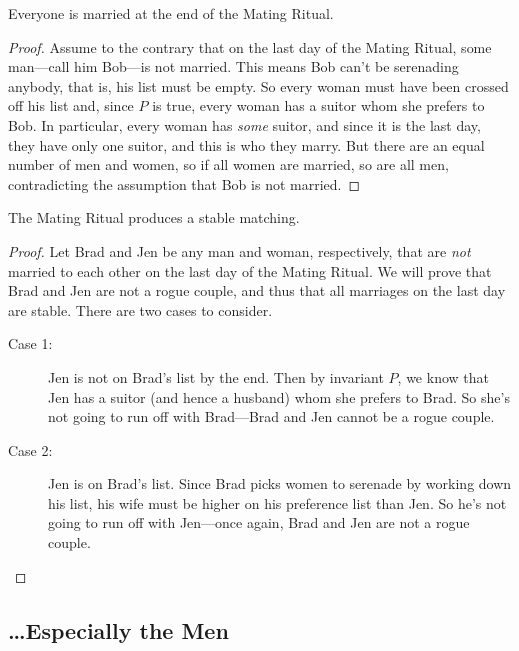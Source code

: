 \begin{theorem}
Everyone is married at the end of the Mating Ritual.
\end{theorem}

\begin{proof}
Assume to the contrary that on the last day of the Mating Ritual, some
man---call him Bob---is not married.  This means Bob can't be
serenading anybody, that is, his list must be empty.  So every woman
must have been crossed off his list and, since $P$ is true, every
woman has a suitor whom she prefers to Bob.  In particular, every
woman has \emph{some} suitor, and since it is the last day, they have
only one suitor, and this is who they marry.  But there are an equal
number of men and women, so if all women are married, so are all men,
contradicting the assumption that Bob is not married.
\end{proof}

\begin{theorem}
The Mating Ritual produces a stable matching.
\end{theorem}

\begin{proof}
Let Brad and Jen be any man and woman, respectively, that are
\emph{not} married to each other on the last day of the Mating Ritual.
We will prove that Brad and Jen are not a rogue couple, and thus that
all marriages on the last day are stable.  There are two cases to consider.
\begin{description}

\item[Case 1:] Jen is not on Brad's list by the end.  Then by
  invariant $P$, we know that Jen has a suitor (and hence a husband)
  whom she prefers to Brad.  So she's not going to run off with
  Brad---Brad and Jen cannot be a rogue couple.

\item[Case 2:] Jen is on Brad's list.  Since Brad picks women to
  serenade by working down his list, his wife must be higher on his
  preference list than Jen.  So he's not going to run off with
  Jen---once again, Brad and Jen are not a rogue couple.  \qedhere

\end{description}

\end{proof}


\subsection{\dots Especially the Men}

